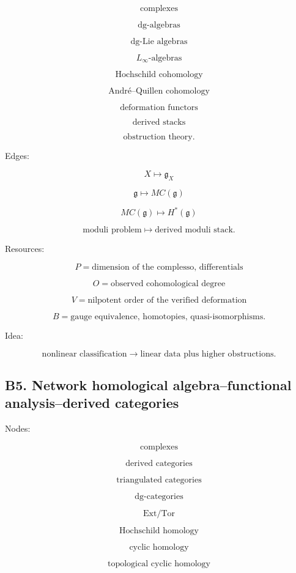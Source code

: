 \documentclass[11pt]{article}
\begin{document}
\[
\text{complexes}
\]

\[
\text{dg-algebras}
\]

\[
\text{dg-Lie algebras}
\]

\[
L_\infty\text{-algebras}
\]

\[
\text{Hochschild cohomology}
\]

\[
\text{André--Quillen cohomology}
\]

\[
\text{deformation functors}
\]

\[
\text{derived stacks}
\]

\[
\text{obstruction theory}.
\]

Edges:

\[
X\mapsto \mathfrak g_X
\]

\[
\mathfrak g\mapsto MC(\mathfrak g)
\]

\[
MC(\mathfrak g)\mapsto H^\ast(\mathfrak g)
\]

\[
\text{moduli problem}\mapsto \text{derived moduli stack}.
\]

Resources:

\[
P=\text{dimension of the complesso, differentials}
\]

\[
O=\text{observed cohomological degree}
\]

\[
V=\text{nilpotent order of the verified deformation}
\]

\[
B=\text{gauge equivalence, homotopies, quasi-isomorphisms}.
\]

Idea:

\[
\text{nonlinear classification}
\to
\text{linear data plus higher obstructions}.
\]



\subsection{B5. Network homological algebra--functional analysis--derived categories}

Nodes:

\[
\text{complexes}
\]

\[
\text{derived categories}
\]

\[
\text{triangulated categories}
\]

\[
\text{dg-categories}
\]

\[
\text{Ext/Tor}
\]

\[
\text{Hochschild homology}
\]

\[
\text{cyclic homology}
\]

\[
\text{topological cyclic homology}
\]
\end{document}
